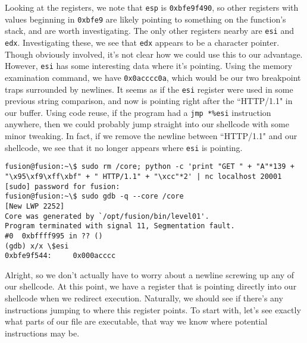 Looking at the registers, we note that \texttt{esp} is \texttt{0xbfe9f490},
so other registers with values beginning in \texttt{0xbfe9} are likely 
pointing to something on the function's stack, and are worth investigating.
The only other registers nearby are \texttt{esi} and \texttt{edx}. Investigating
these, we see that \texttt{edx} appears to be a character pointer. Though
obviously involved, it's not clear how we could use this to our advantage.
However, \texttt{esi} has some interesting data where it's pointing.
Using the memory examination command, we have \texttt{0x0acccc0a}, which would
be our two breakpoint traps surrounded by newlines. It seems as if
the \texttt{esi} register were used in some previous string comparison, and
now is pointing right after the ``HTTP/1.1" in our buffer. Using code reuse,
if the program had a \texttt{jmp *\%esi} instruction anywhere, then we 
could probably jump straight into our shellcode with some minor tweaking.
In fact, if we remove the newline between ``HTTP/1.1" and our shellcode,
we see that it no longer appears where \texttt{esi} is pointing.

\begin{lstlisting}
fusion@fusion:~\$ sudo rm /core; python -c 'print "GET " + "A"*139 + "\x95\xf9\xff\xbf" + " HTTP/1.1" + "\xcc"*2' | nc localhost 20001
[sudo] password for fusion: 
fusion@fusion:~\$ sudo gdb -q --core /core
[New LWP 2252]
Core was generated by `/opt/fusion/bin/level01'.
Program terminated with signal 11, Segmentation fault.
#0  0xbffff995 in ?? ()
(gdb) x/x \$esi
0xbfe9f544:     0x000acccc
\end{lstlisting}

Alright, so we don't actually have to worry about a newline screwing up any of our
shellcode. At this point, we have a register that is pointing directly
into our shellcode when we redirect execution. Naturally, we should
see if there's any instructions jumping to where this register points.
To start with, let's see exactly what parts of our file are executable,
that way we know where potential instructions may be.

